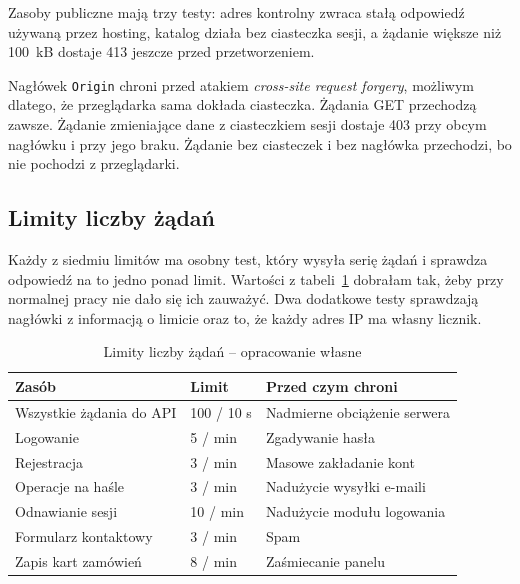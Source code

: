 Zasoby publiczne mają trzy testy: adres kontrolny zwraca stałą odpowiedź używaną przez hosting, katalog działa bez ciasteczka sesji, a żądanie większe niż 100~kB dostaje 413 jeszcze przed przetworzeniem.

Nagłówek \texttt{Origin} chroni przed atakiem \textit{cross-site request forgery}, możliwym dlatego, że przeglądarka sama dokłada ciasteczka. Żądania GET przechodzą zawsze. Żądanie zmieniające dane z ciasteczkiem sesji dostaje 403 przy obcym nagłówku i przy jego braku. Żądanie bez ciasteczek i bez nagłówka przechodzi, bo nie pochodzi z przeglądarki.

\subsection{Limity liczby żądań}
\label{ssec:limity-zadan}

Każdy z siedmiu limitów ma osobny test, który wysyła serię żądań i sprawdza odpowiedź na to jedno ponad limit. Wartości z tabeli~\ref{tab:limity-zadan} dobrałam tak, żeby przy normalnej pracy nie dało się ich zauważyć. Dwa dodatkowe testy sprawdzają nagłówki z informacją o limicie oraz to, że każdy adres IP ma własny licznik.

\begin{table}[htbp]
\centering
\caption{Limity liczby żądań -- opracowanie własne}
\label{tab:limity-zadan}
\begin{tabular}{|p{}|p{}|p{}|}
\hline
\textbf{Zasób} & \textbf{Limit} & \textbf{Przed czym chroni} \\
\hline
Wszystkie żądania do API & 100 / 10 s & Nadmierne obciążenie serwera \\
\hline
Logowanie & 5 / min & Zgadywanie hasła \\
\hline
Rejestracja & 3 / min & Masowe zakładanie kont \\
\hline
Operacje na haśle & 3 / min & Nadużycie wysyłki e-maili \\
\hline
Odnawianie sesji & 10 / min & Nadużycie modułu logowania \\
\hline
Formularz kontaktowy & 3 / min & Spam \\
\hline
Zapis kart zamówień & 8 / min & Zaśmiecanie panelu \\
\hline
\end{tabular}
\end{table}
